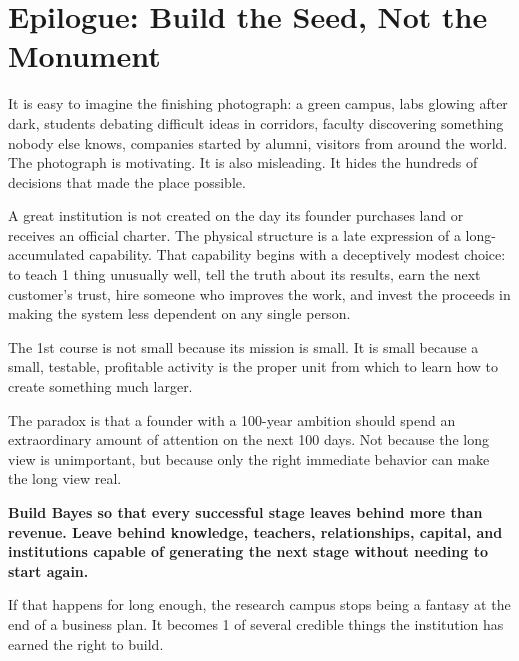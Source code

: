 \section*{Epilogue: Build the Seed, Not the Monument}

It is easy to imagine the finishing photograph: a green campus, labs glowing after dark, students debating difficult ideas in corridors, faculty discovering something nobody else knows, companies started by alumni, visitors from around the world. The photograph is motivating. It is also misleading. It hides the hundreds of decisions that made the place possible.

A great institution is not created on the day its founder purchases land or receives an official charter. The physical structure is a late expression of a long-accumulated capability. That capability begins with a deceptively modest choice: to teach 1 thing unusually well, tell the truth about its results, earn the next customer's trust, hire someone who improves the work, and invest the proceeds in making the system less dependent on any single person.

The 1st course is not small because its mission is small. It is small because a small, testable, profitable activity is the proper unit from which to learn how to create something much larger.

The paradox is that a founder with a 100-year ambition should spend an extraordinary amount of attention on the next 100 days. Not because the long view is unimportant, but because only the right immediate behavior can make the long view real.

\textbf{Build Bayes so that every successful stage leaves behind more than revenue. Leave behind knowledge, teachers, relationships, capital, and institutions capable of generating the next stage without needing to start again.}

If that happens for long enough, the research campus stops being a fantasy at the end of a business plan. It becomes 1 of several credible things the institution has earned the right to build.

